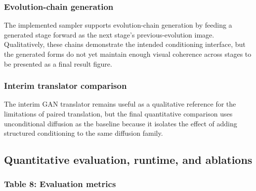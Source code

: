 \documentclass[
]{article}
\begin{document}
\subsubsection{Evolution-chain
generation}\label{evolution-chain-generation}

The implemented sampler supports evolution-chain generation by feeding a
generated stage forward as the next stage's previous-evolution image.
Qualitatively, these chains demonstrate the intended conditioning
interface, but the generated forms do not yet maintain enough visual
coherence across stages to be presented as a final result figure.

\subsubsection{Interim translator comparison}\label{interim-translator-comparison}

The interim GAN translator remains useful as a qualitative reference for the
limitations of paired translation, but the final quantitative comparison
uses unconditional diffusion as the baseline because it isolates the
effect of adding structured conditioning to the same diffusion family.

\subsection{Quantitative evaluation, runtime, and
ablations}\label{quantitative-evaluation-runtime-and-ablations}

\subsubsection{Table 8: Evaluation
metrics}\label{table-8.-evaluation-metrics}
\end{document}
